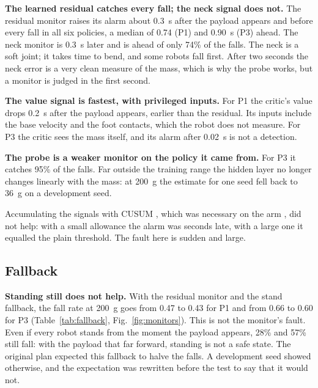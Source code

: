\documentclass[conference]{IEEEtran}
\begin{document}
\textbf{The learned residual catches every fall; the neck signal does not.} The residual monitor raises its alarm about \SI{0.3}{s} after the payload appears and before every fall in all six policies, a median of 0.74 (P1) and \SI{0.90}{s} (P3) ahead.
The neck monitor is \SI{0.3}{s} later and is ahead of only 74\% of the falls.
The neck is a soft joint; it takes time to bend, and some robots fall first.
After two seconds the neck error is a very clean measure of the mass, which is why the probe works, but a monitor is judged in the first second.

\textbf{The value signal is fastest, with privileged inputs.} For P1 the critic's value drops \SI{0.2}{s} after the payload appears, earlier than the residual. Its inputs include the base velocity and the foot contacts, which the robot does not measure. For P3 the critic sees the mass itself, and its alarm after \SI{0.02}{s} is not a detection.

\textbf{The probe is a weaker monitor on the policy it came from.} For P3 it catches 95\% of the falls. Far outside the training range the hidden layer no longer changes linearly with the mass: at \SI{200}{g} the estimate for one seed fell back to \SI{36}{g} on a development seed.

Accumulating the signals with CUSUM \cite{page1954cusum}, which was necessary on the arm \cite{li2026arm}, did not help: with a small allowance the alarm was seconds late, with a large one it equalled the plain threshold. The fault here is sudden and large.

\begin{table}[t]
\centering
\caption{Part III. Monitors on the test seeds. False-alarm rate on episodes with 0--\SI{100}{g}; the other rows at \SI{200}{g}. Caught: falls with an alarm before the fall. Lead time: alarm to fall. Delay: payload to alarm.}
\label{tab:monitors}
\footnotesize
\setlength{\tabcolsep}{4pt}

\end{table}

\subsection{Fallback}

\textbf{Standing still does not help.} With the residual monitor and the stand fallback, the fall rate at \SI{200}{g} goes from 0.47 to 0.43 for P1 and from 0.66 to 0.60 for P3 (Table~\ref{tab:fallback}, Fig.~\ref{fig:monitors}).
This is not the monitor's fault. Even if every robot stands from the moment the payload appears, 28\% and 57\% still fall: with the payload that far forward, standing is not a safe state.
The original plan expected this fallback to halve the falls. A development seed showed otherwise, and the expectation was rewritten before the test to say that it would not.
\end{document}
